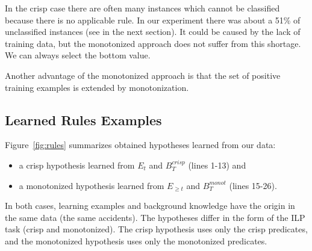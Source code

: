 In the crisp case there are often many instances which cannot be classified because there is no applicable rule. In our experiment there was about a 51\%
of unclassified instances (see in the next section). It could be caused by the lack of training data, but the monotonized approach does not suffer from this shortage. We can always select the bottom value.

Another advantage of the monotonized approach is that the set of positive training examples is extended by monotonization. 





\subsection{Learned Rules Examples} \label{sec:fuzzy_results}

Figure~\ref{fig:rules} summarizes obtained hypotheses learned from our data: 
\begin{itemize}
	\item a crisp hypothesis learned from $E_t$ and $B^{crisp}_{T}$ (lines 1-13) and
	\item a monotonized hypothesis learned from $E_{\ge t}$ and ${B}^{monot}_T$ (lines 15-26).
\end{itemize}


In both cases, learning examples and background knowledge have the origin in the same data (the same accidents). The hypotheses differ in the form of the ILP task (crisp and monotonized). The crisp hypothesis uses only the crisp predicates, and the monotonized hypothesis uses only the monotonized predicates.




